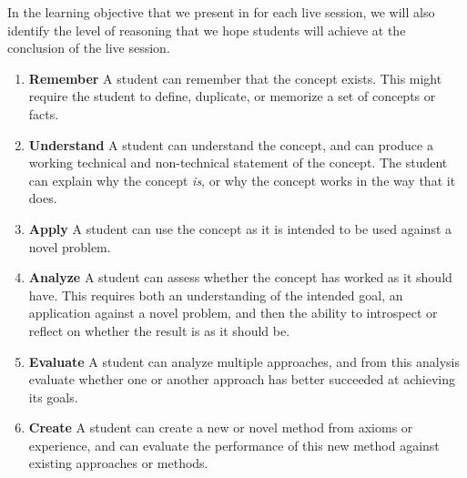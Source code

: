 \documentclass[
]{book}
\providecommand{\tightlist}{%
  \setlength{\itemsep}{0pt}\setlength{\parskip}{0pt}}
\theoremstyle{definition}
\theoremstyle{definition}
\theoremstyle{definition}
\theoremstyle{definition}
\theoremstyle{remark}
\begin{document}
In the learning objective that we present in for each live session, we will also identify the level of reasoning that we hope students will achieve at the conclusion of the live session.

\begin{enumerate}
\def\labelenumi{\arabic{enumi}.}
\tightlist
\item
  \textbf{Remember} A student can remember that the concept exists. This might require the student to define, duplicate, or memorize a set of concepts or facts.
\item
  \textbf{Understand} A student can understand the concept, and can produce a working technical and non-technical statement of the concept. The student can explain why the concept \emph{is}, or why the concept works in the way that it does.
\item
  \textbf{Apply} A student can use the concept as it is intended to be used against a novel problem.
\item
  \textbf{Analyze} A student can assess whether the concept has worked as it should have. This requires both an understanding of the intended goal, an application against a novel problem, and then the ability to introspect or reflect on whether the result is as it should be.
\item
  \textbf{Evaluate} A student can analyze multiple approaches, and from this analysis evaluate whether one or another approach has better succeeded at achieving its goals.
\item
  \textbf{Create} A student can create a new or novel method from axioms or experience, and can evaluate the performance of this new method against existing approaches or methods.
\end{enumerate}
\end{document}
